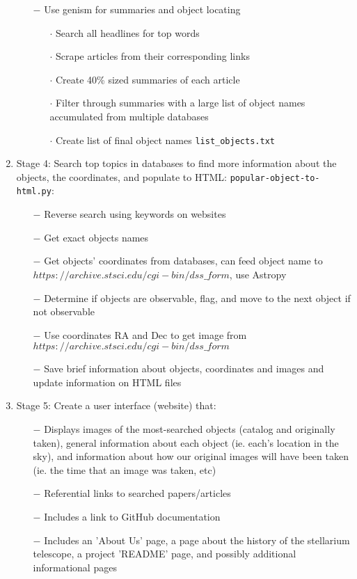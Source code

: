 \documentclass[12pt,letterpaper]{article}
\begin{document}
\begin{enumerate}[leftmargin=*]
\begin{enumerate}
            \item [$-$] Use genism for summaries and object locating
            \begin{enumerate}[leftmargin=*]
                \item[$\cdot$] Search all headlines for top words
                \item[$\cdot$] Scrape articles from their corresponding links
                \item[$\cdot$] Create 40\% sized summaries of each article 
                \item[$\cdot$] Filter through summaries with a large 
                  list of object names accumulated from multiple databases
                 \item[$\cdot$] Create list of final object names \texttt{list\_objects.txt}
            \end{enumerate}
        \end{enumerate}
    \item Stage 4: Search top topics in databases to find more information 
    about the objects, the coordinates, and populate to HTML: \texttt{popular-object-to-html.py}:
        \begin{enumerate}
            \item [$-$] Reverse search using keywords on websites
            \item [$-$] Get exact objects names
            \item [$-$] Get objects' coordinates from databases, can feed object 
              name to $https://archive.stsci.edu/cgi-bin/dss\_form$, use Astropy
            \item [$-$] Determine if objects are observable, flag, and move to the next object if not observable
            \item [$-$] Use coordinates RA and Dec to get image 
              from $https://archive.stsci.edu/cgi-bin/dss\_form$
            \item [$-$] Save brief information about objects, coordinates and images and update information on HTML files
        \end{enumerate}
    \item Stage 5: Create a user interface (website) that:
    \begin{enumerate}
        \item [$-$] Displays images of the most-searched objects (catalog and originally taken),
        general information about each object (ie. each's location in the sky), and information about
        how our original images will have been taken (ie. the time that an image was taken, etc)
        \item [$-$] Referential links to searched papers/articles
        \item [$-$] Includes a link to GitHub documentation
        \item [$-$] Includes an 'About Us' page, a page about the history of the stellarium telescope, 
          a project 'README' page, and possibly additional informational pages
    \end{enumerate}
\end{enumerate}
\end{document}
